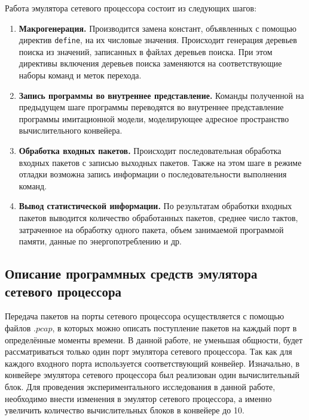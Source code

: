 \documentclass[oneside,final,12pt]{extarticle}
\begin{document}
        Работа эмулятора сетевого процессора состоит из следующих шагов:
        \begin{enumerate}
            \item \textbf{Макрогенерация.} Производится замена констант, объявленных с помощью 
                директив \texttt{define}, на их числовые значения. Происходит генерация 
                деревьев поиска из значений, записанных в файлах деревьев поиска. 
                При этом директивы включения деревьев поиска заменяются на соответствующие наборы 
                команд и меток перехода.
            \item \textbf{Запись программы во внутреннее представление.} Команды полученной на 
                предыдущем шаге программы переводятся во внутреннее представление программы 
                имитационной модели, моделирующее адресное пространство вычислительного конвейера.
            \item \textbf{Обработка входных пакетов.} Происходит последовательная обработка 
                входных пакетов с записью выходных пакетов. Также на этом шаге в режиме отладки 
                возможна запись информации о последовательности выполнения команд.
            \item \textbf{Вывод статистической информации.} По результатам обработки входных 
                пакетов выводится количество обработанных пакетов, среднее число тактов, 
                затраченное на обработку одного пакета, объем занимаемой программой памяти, 
                данные по энергопотреблению и др.
        \end{enumerate}

        \subsection{Описание программных средств эмулятора сетевого процессора}
            Передача пакетов на порты сетевого процессора осуществляется с помощью файлов $.pcap$, в которых можно описать поступление пакетов на каждый порт в определённые моменты времени.
            В данной работе, не уменьшая общности, будет рассматриваться только один порт эмулятора сетевого процессора. Так как для каждого входного
            порта используется соответствующий конвейер. Изначально, в конвейере эмулятора сетевого процессора был реализован один вычислительный блок.
            Для проведения экспериментального исследования в данной работе, необходимо внести изменения в эмулятор сетевого процессора, а именно увеличить количество вычислительных блоков 
            в конвейере до 10.
\end{document}
